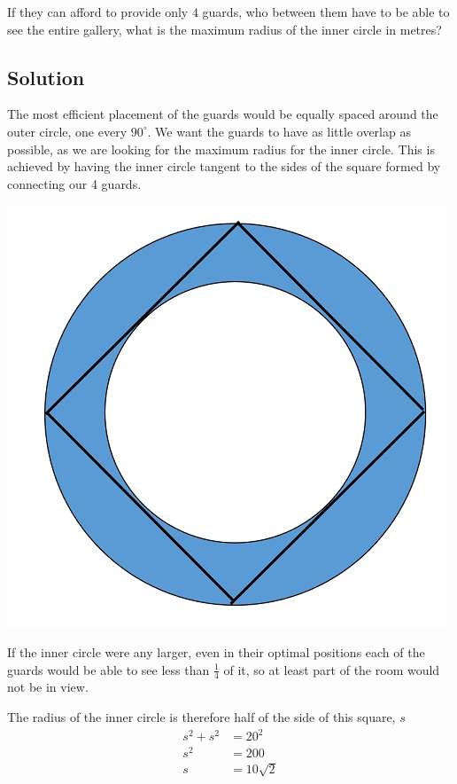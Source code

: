 \documentclass{book}
\begin{document}
If they can afford to provide only \(4\) guards, who between them have to be able to see the entire gallery, what is the maximum radius of the inner circle in metres?

\subsection{Solution}
The most efficient placement of the guards would be equally spaced around the outer circle, one every \(90^{\circ}\). We want the guards to have as little overlap as possible, as we are looking for the maximum radius for the inner circle. This is achieved by having the inner circle tangent to the sides of the square formed by connecting our 4 guards.


\begin{center}
\includegraphics{annulus2}
\end{center}
If the inner circle were any larger, even in their optimal positions each of the guards would be able to see less than \(\frac{1}{4}\) of it, so at least part of the room would not be in view.

The radius of the inner circle is therefore half of the side of this square, \(s\)
\begin{align*}
  s^2+s^2&=20^2\\
  s^2&=200\\
  s&=10\sqrt{2}
\end{align*}
\end{document}
